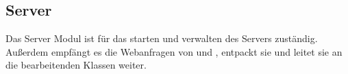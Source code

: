 \subsection{Server} \label{service:modul:Server}
Das Server Modul ist für das starten und verwalten des Servers zuständig. Außerdem empfängt es die Webanfragen von  und , entpackt sie und leitet sie an die bearbeitenden Klassen weiter.